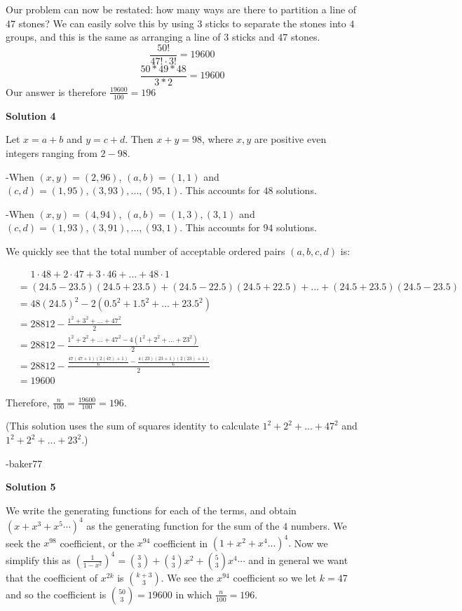 \begin{enumerate}
 Our problem can now be restated: how many ways are there to partition a line of $47$ stones? We can easily solve this by using $3$ sticks to separate the stones into $4$ groups, and this is the same as arranging a line of $3$ sticks and $47$ stones.  
 \[\frac{50!}{47! \cdot 3!} = 19600\] 
 \[\frac{50 * 49 * 48}{3 * 2} = 19600\] Our answer is therefore $\frac{19600}{100} = \boxed{196}$




\textbf{Solution 4}

Let $x = a + b$ and $y = c + d$. Then $x + y = 98$, where $x, y$ are positive even integers ranging from $2-98$.

 -When $(x, y) = (2, 96)$, $(a, b) = (1, 1)$ and $(c, d) = (1, 95), (3, 93),...,(95, 1)$. This accounts for $48$ solutions.

 -When $(x, y) = (4, 94)$, $(a, b) = (1, 3), (3, 1)$ and $(c, d) = (1, 93),  (3, 91),...,(93, 1)$. This accounts for $94$ solutions.

 We quickly see that the total number of acceptable ordered pairs $(a, b, c, d)$ is:

 
 \begin{align*} &\mathrel{\phantom{=}} 1 \cdot 48 + 2 \cdot 47 + 3 \cdot 46 + ... + 48 \cdot 1\\ &= (24.5 - 23.5)(24.5 + 23.5) + (24.5 - 22.5)(24.5 + 22.5) + ... + (24.5 + 23.5)(24.5 - 23.5)\\ &= 48(24.5)^2 - 2(0.5^2 + 1.5^2 + ... + 23.5^2)\\ &= 28812 - \frac{1^2 + 3^2 + ... + 47^2}{2}\\ &= 28812 - \frac{1^2 + 2^2 + ... + 47^2 - 4(1^2 + 2^2 + ... + 23^2)}{2}\\ &= 28812 - \frac{\frac{47(47 + 1)(2(47) + 1)}{6} - \frac{4(23)(23 + 1)(2(23) + 1)}{6}}{2}\\ &= 19600 \end{align*}


 Therefore, $\frac{n}{100} = \frac{19600}{100} = \boxed{196}$.

 (This solution uses the sum of squares identity to calculate $1^2 + 2^2 + ... + 47^2$ and $1^2 + 2^2 + ... + 23^2$.)

 -baker77

 



\textbf{Solution 5}

We write the generating functions for each of the terms, and obtain $(x+x^3+x^5\cdots)^4$ as the generating function for the sum of the $4$ numbers. We seek the $x^{98}$ coefficient, or the $x^{94}$ coefficient in $(1+x^2+x^4...)^4.$ Now we simplify this as $\left(\frac{1}{1-x^2}\right)^4=\binom{3}{3} +\binom{4}{3}x^2+\binom{5}{3}x^4 \cdots$ and in general we want that the coefficient of $x^{2k}$ is $\binom{k+3}{3}.$ We see the $x^{94}$ coefficient so we let $k=47$ and so the coefficient is $\binom{50}{3}=19600$ in which $\frac{n}{100}=\boxed{196}.$




\end{enumerate}
